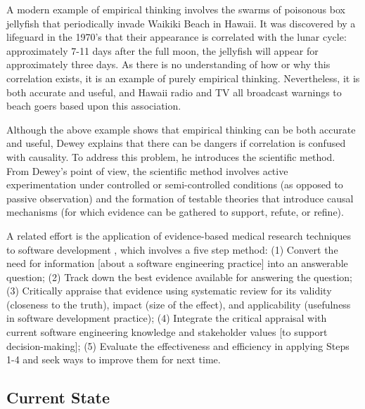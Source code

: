 A modern example of empirical thinking involves the swarms of poisonous box
jellyfish that periodically invade Waikiki Beach in Hawaii.  It was
discovered by a lifeguard in the 1970's that their appearance is correlated
with the lunar cycle: approximately 7-11 days after the full moon, the
jellyfish will appear for approximately three days.  As there is no
understanding of how or why this correlation exists, it is an example of
purely empirical thinking.  Nevertheless, it is both accurate and useful,
and Hawaii radio and TV all broadcast warnings to beach goers based upon
this association.

Although the above example shows that empirical thinking can be
both accurate and useful, Dewey explains that there can be dangers if
correlation is confused with causality. To address this problem, he
introduces the scientific method.  From Dewey's point of view, the
scientific method involves active experimentation under controlled or
semi-controlled conditions (as opposed to passive observation) and the
formation of testable theories that introduce causal mechanisms (for which
evidence can be gathered to support, refute, or refine).  

A related effort is the application of evidence-based medical research
techniques to software development \citep{Kitchenham04,Kitchenham04a},
which involves a five step method: (1) Convert the need for information
[about a software engineering practice] into an answerable question; (2)
Track down the best evidence available for answering the question; (3)
Critically appraise that evidence using systematic review for its validity
(closeness to the truth), impact (size of the effect), and applicability
(usefulness in software development practice); (4) Integrate the critical
appraisal with current software engineering knowledge and stakeholder
values [to support decision-making]; (5) Evaluate the effectiveness and
efficiency in applying Steps 1-4 and seek ways to improve them for next
time.  


\subsection{Current State}
\label{sec:current-state}


